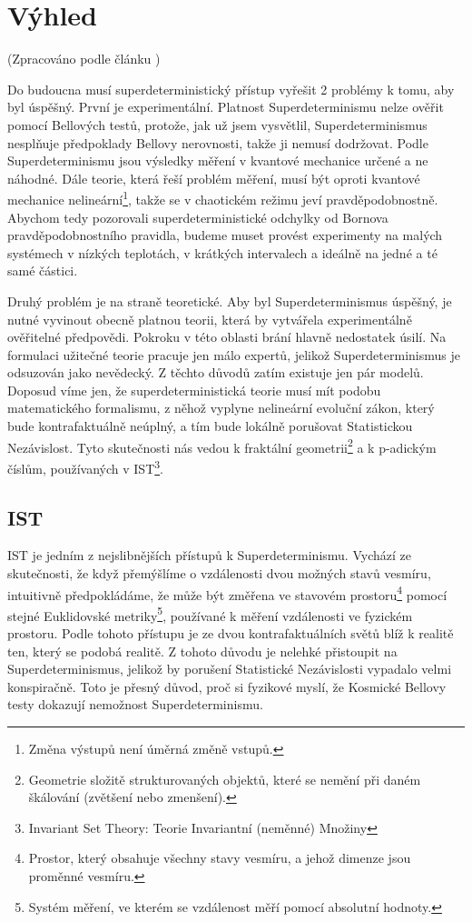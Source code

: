 \section{Výhled}
(Zpracováno podle článku \cite{supdet:rethink})

Do budoucna musí superdeterministický přístup vyřešit 2 problémy k tomu, aby byl úspěšný. První je experimentální. Platnost Superdeterminismu nelze ověřit pomocí Bellových testů, protože, jak už jsem vysvětlil, Superdeterminismus nesplňuje předpoklady Bellovy nerovnosti, takže ji nemusí dodržovat. Podle Superdeterminismu jsou výsledky měření v kvantové mechanice určené a ne náhodné. Dále teorie, která řeší problém měření, musí být oproti kvantové mechanice nelineární\footnote[17]{Změna výstupů není úměrná změně vstupů.}, takže se v chaotickém režimu jeví pravděpodobnostně. Abychom tedy pozorovali superdeterministické odchylky od Bornova pravděpodobnostního pravidla, budeme muset provést experimenty na malých systémech v nízkých teplotách, v krátkých intervalech a ideálně na jedné a té samé částici. 

Druhý problém je na straně teoretické. Aby byl Superdeterminismus úspěšný, je nutné vyvinout obecně platnou teorii, která by vytvářela experimentálně ověřitelné předpovědi. Pokroku v této oblasti brání hlavně nedostatek úsilí. Na formulaci užitečné teorie pracuje jen málo expertů, jelikož Superdeterminismus je odsuzován jako nevědecký. Z těchto důvodů zatím existuje jen pár  modelů. Doposud víme jen, že superdeterministická teorie musí mít podobu matematického formalismu, z něhož vyplyne nelineární evoluční zákon, který bude kontrafaktuálně neúplný, a tím bude lokálně porušovat Statistickou Nezávislost. Tyto skutečnosti nás vedou k fraktální geometrii\footnote[18]{Geometrie složitě strukturovaných objektů, které se nemění při daném škálování (zvětšení nebo zmenšení).} a k p-adickým číslům, používaných v IST\footnote[19]{Invariant Set Theory: Teorie Invariantní (neměnné) Množiny}. 

\subsection{IST}
IST je jedním z nejslibnějších přístupů k Superdeterminismu. Vychází ze skutečnosti, že když přemýšlíme o vzdálenosti dvou možných stavů vesmíru, intuitivně předpokládáme, že může být změřena ve stavovém prostoru\footnote[20]{Prostor, který obsahuje všechny stavy vesmíru, a jehož dimenze jsou proměnné vesmíru.} pomocí stejné Euklidovské metriky\footnote[21]{Systém měření, ve kterém se vzdálenost měří pomocí absolutní hodnoty.}, používané k měření vzdálenosti ve fyzickém prostoru. Podle tohoto přístupu je ze dvou kontrafaktuálních světů blíž k realitě ten, který se  podobá realitě. Z tohoto důvodu je nelehké přistoupit na Superdeterminismus, jelikož by porušení Statistické Nezávislosti vypadalo velmi konspiračně. Toto je přesný důvod, proč si fyzikové myslí, že Kosmické Bellovy testy dokazují nemožnost Superdeterminismu. 

